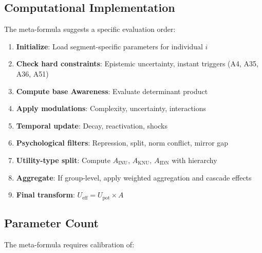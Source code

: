 \subsection{Computational Implementation}

The meta-formula suggests a specific evaluation order:

\begin{enumerate}
    \item \textbf{Initialize}: Load segment-specific parameters for individual $i$
    \item \textbf{Check hard constraints}: Epistemic uncertainty, instant triggers (A4, A35, A36, A51)
    \item \textbf{Compute base Awareness}: Evaluate determinant product
    \item \textbf{Apply modulations}: Complexity, uncertainty, interactions
    \item \textbf{Temporal update}: Decay, reactivation, shocks
    \item \textbf{Psychological filters}: Repression, split, norm conflict, mirror gap
    \item \textbf{Utility-type split}: Compute $A_{\text{INU}}$, $A_{\text{KNU}}$, $A_{\text{IDN}}$ with hierarchy
    \item \textbf{Aggregate}: If group-level, apply weighted aggregation and cascade effects
    \item \textbf{Final transform}: $U_{\text{eff}} = U_{\text{pot}} \times A$
\end{enumerate}

\subsection{Parameter Count}

The meta-formula requires calibration of:

